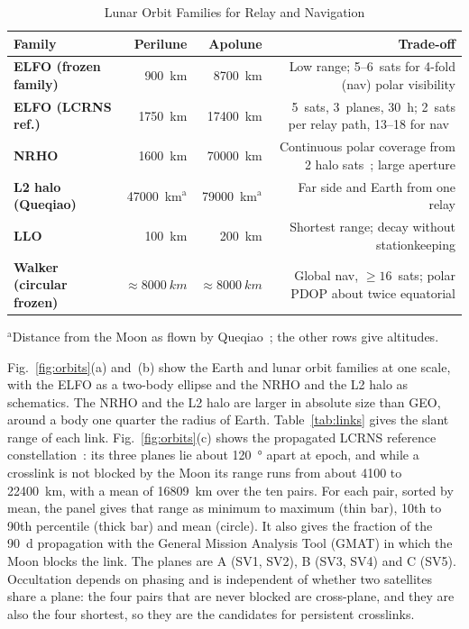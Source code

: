 \documentclass{IEEEoj}
\begin{document}
\begin{table}[!t]
\caption{Lunar Orbit Families for Relay and Navigation}
\label{tab:orbits}
\centering
\footnotesize
\setlength{\tabcolsep}{4pt}
\begin{tabularx}{\columnwidth}{@{}>{\raggedright\arraybackslash\bfseries}p{1.9cm}rrR}
\toprule
{}\textbf{Family} & \textbf{Perilune} & \textbf{Apolune} & \textbf{Trade-off} \\
\midrule
ELFO (frozen family) & \SI{900}{km} & \SI{8700}{km} & Low range; 5--6~sats for 4-fold (nav) polar visibility \\
ELFO (LCRNS ref.) & \SI{1750}{km} & \SI{17400}{km} & 5~sats, 3~planes, \SI{30}{h}; 2~sats per relay path, 13--18 for nav~\cite{lcrns_ref_const,asok2027space} \\
NRHO & \SI{1600}{km} & \SI{70000}{km} & Continuous polar coverage from 2 halo sats~\cite{asok2027space}; large aperture \\
L2 halo (Queqiao) & \SI{47000}{km}$^{\mathrm{a}}$ & \SI{79000}{km}$^{\mathrm{a}}$ & Far side and Earth from one relay \\
LLO & \SI{100}{km} & \SI{200}{km} & Shortest range; decay without stationkeeping \\
Walker (circular frozen) & ${\approx}\SI{8000}{km}$ & ${\approx}\SI{8000}{km}$ & Global nav, ${\geq}16$~sats; polar PDOP about twice equatorial \\
\bottomrule
\end{tabularx}
\par\smallskip\raggedright\footnotesize $^{\mathrm{a}}$Distance from the Moon as flown by Queqiao~\cite{chen_ce4_relay}; the other rows give altitudes.
\end{table}



Fig.~\ref{fig:orbits}(a) and~(b) show the Earth and lunar orbit families at one scale, with the ELFO as a two-body ellipse and the NRHO and the L2 halo as schematics. The NRHO and the L2 halo are larger in absolute size than GEO, around a body one quarter the radius of Earth. Table~\ref{tab:links} gives the slant range of each link. Fig.~\ref{fig:orbits}(c) shows the propagated LCRNS reference constellation~\cite{asok2027space}: its three planes lie about \SI{120}{\degree} apart at epoch, and while a crosslink is not blocked by the Moon its range runs from about \SI{4100}{} to \SI{22400}{km}, with a mean of \SI{16809}{km} over the ten pairs. For each pair, sorted by mean, the panel gives that range as minimum to maximum (thin bar), 10th to 90th percentile (thick bar) and mean (circle). It also gives the fraction of the \SI{90}{d} propagation with the General Mission Analysis Tool (GMAT) in which the Moon blocks the link. The planes are A (SV1, SV2), B (SV3, SV4) and C (SV5). Occultation depends on phasing and is independent of whether two satellites share a plane: the four pairs that are never blocked are cross-plane, and they are also the four shortest, so they are the candidates for persistent crosslinks.
\end{document}
